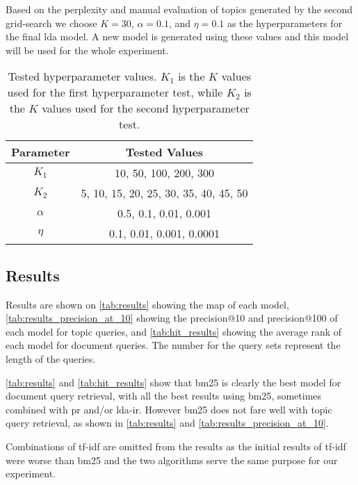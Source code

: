Based on the perplexity and manual evaluation of topics generated by the second grid-search we choose $K = 30$, $\alpha = 0.1$, and $\eta = 0.1$ as the hyperparameters for the final \gls{lda} model.
A new model is generated using these values and this model will be used for the whole experiment.

\begin{table}[h]
	\centering
	\begin{tabular}{c|c}
		Parameter & Tested Values\\
		\hline
		$K_1$ & 10, 50, 100, 200, 300\\
		$K_2$ & 5, 10, 15, 20, 25, 30, 35, 40, 45, 50\\
		$\alpha$ & 0.5, 0.1, 0.01, 0.001\\
		$\eta$ & 0.1, 0.01, 0.001, 0.0001\\
	\end{tabular}
	\caption{Tested hyperparameter values. $K_1$ is the $K$ values used for the first hyperparameter test, while $K_2$ is the $K$ values used for the second hyperparameter test.}
	\label{tab:params}
\end{table}


\subsection{Results}\label{subsec:results}

Results are shown on \autoref{tab:results} showing the \acrlong{map} of each model, \autoref{tab:results_precision_at_10} showing the precision@10 and precision@100 of each model for topic queries, and \autoref{tab:hit_results} showing the average rank of each model for document queries.
The number for the query sets represent the length of the queries.

\autoref{tab:results} and \autoref{tab:hit_results} show that \gls{bm25} is clearly the best model for document query retrieval, with all the best results using \gls{bm25}, sometimes combined with \gls{pr} and/or \gls{lda}-\gls{ir}. 
However \gls{bm25} does not fare well with topic query retrieval, as shown in \autoref{tab:results} and \autoref{tab:results_precision_at_10}.

Combinations of \gls{tf-idf} are omitted from the results as the initial results of \gls{tf-idf} were worse than \gls{bm25} and the two algorithms serve the same purpose for our experiment.


